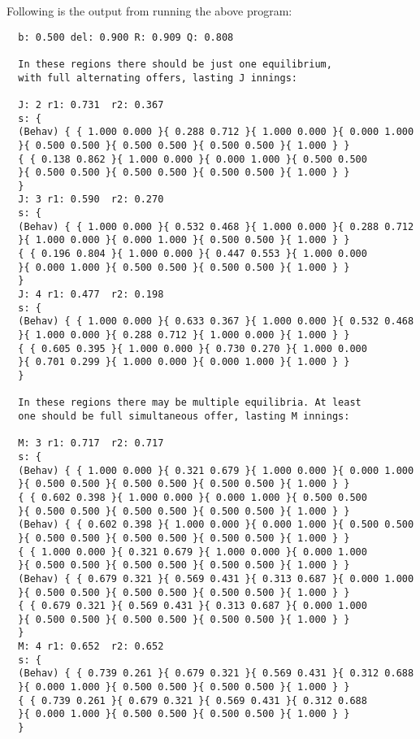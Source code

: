 \noindent
Following is the output from running the above program:
{\scriptsize
\begin{verbatim}
  b: 0.500 del: 0.900 R: 0.909 Q: 0.808

  In these regions there should be just one equilibrium,
  with full alternating offers, lasting J innings:
 
  J: 2 r1: 0.731  r2: 0.367
  s: {
  (Behav) { { 1.000 0.000 }{ 0.288 0.712 }{ 1.000 0.000 }{ 0.000 1.000
  }{ 0.500 0.500 }{ 0.500 0.500 }{ 0.500 0.500 }{ 1.000 } }
  { { 0.138 0.862 }{ 1.000 0.000 }{ 0.000 1.000 }{ 0.500 0.500 
  }{ 0.500 0.500 }{ 0.500 0.500 }{ 0.500 0.500 }{ 1.000 } } 
  }
  J: 3 r1: 0.590  r2: 0.270
  s: {
  (Behav) { { 1.000 0.000 }{ 0.532 0.468 }{ 1.000 0.000 }{ 0.288 0.712
  }{ 1.000 0.000 }{ 0.000 1.000 }{ 0.500 0.500 }{ 1.000 } }
  { { 0.196 0.804 }{ 1.000 0.000 }{ 0.447 0.553 }{ 1.000 0.000 
  }{ 0.000 1.000 }{ 0.500 0.500 }{ 0.500 0.500 }{ 1.000 } } 
  }
  J: 4 r1: 0.477  r2: 0.198
  s: {
  (Behav) { { 1.000 0.000 }{ 0.633 0.367 }{ 1.000 0.000 }{ 0.532 0.468
  }{ 1.000 0.000 }{ 0.288 0.712 }{ 1.000 0.000 }{ 1.000 } }
  { { 0.605 0.395 }{ 1.000 0.000 }{ 0.730 0.270 }{ 1.000 0.000 
  }{ 0.701 0.299 }{ 1.000 0.000 }{ 0.000 1.000 }{ 1.000 } } 
  }

  In these regions there may be multiple equilibria. At least 
  one should be full simultaneous offer, lasting M innings:

  M: 3 r1: 0.717  r2: 0.717
  s: {
  (Behav) { { 1.000 0.000 }{ 0.321 0.679 }{ 1.000 0.000 }{ 0.000 1.000
  }{ 0.500 0.500 }{ 0.500 0.500 }{ 0.500 0.500 }{ 1.000 } }
  { { 0.602 0.398 }{ 1.000 0.000 }{ 0.000 1.000 }{ 0.500 0.500 
  }{ 0.500 0.500 }{ 0.500 0.500 }{ 0.500 0.500 }{ 1.000 } }
  (Behav) { { 0.602 0.398 }{ 1.000 0.000 }{ 0.000 1.000 }{ 0.500 0.500
  }{ 0.500 0.500 }{ 0.500 0.500 }{ 0.500 0.500 }{ 1.000 } }
  { { 1.000 0.000 }{ 0.321 0.679 }{ 1.000 0.000 }{ 0.000 1.000 
  }{ 0.500 0.500 }{ 0.500 0.500 }{ 0.500 0.500 }{ 1.000 } }
  (Behav) { { 0.679 0.321 }{ 0.569 0.431 }{ 0.313 0.687 }{ 0.000 1.000
  }{ 0.500 0.500 }{ 0.500 0.500 }{ 0.500 0.500 }{ 1.000 } }
  { { 0.679 0.321 }{ 0.569 0.431 }{ 0.313 0.687 }{ 0.000 1.000 
  }{ 0.500 0.500 }{ 0.500 0.500 }{ 0.500 0.500 }{ 1.000 } } 
  }
  M: 4 r1: 0.652  r2: 0.652
  s: {
  (Behav) { { 0.739 0.261 }{ 0.679 0.321 }{ 0.569 0.431 }{ 0.312 0.688
  }{ 0.000 1.000 }{ 0.500 0.500 }{ 0.500 0.500 }{ 1.000 } }
  { { 0.739 0.261 }{ 0.679 0.321 }{ 0.569 0.431 }{ 0.312 0.688 
  }{ 0.000 1.000 }{ 0.500 0.500 }{ 0.500 0.500 }{ 1.000 } } 
  }
\end{verbatim}
}

